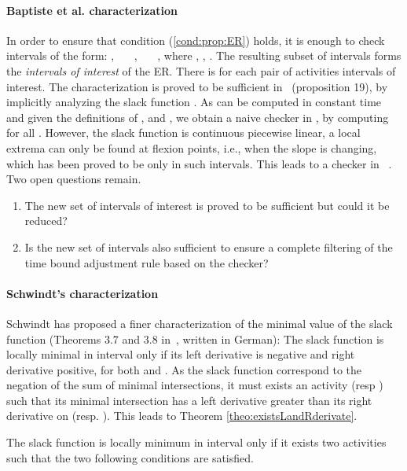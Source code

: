 \documentclass{llncs}
\begin{document}
\paragraph{\bf Baptiste et al. characterization}  
In order to ensure that condition (\ref{cond:prop:ER}) holds, it is enough to check intervals of the form: 
    ,~~~
    ,~~~
    ,
where
, 
,
.
The resulting subset of intervals forms the \emph{intervals of interest} of the ER. 
There is for each pair of activities   intervals of interest. 
The characterization is proved to be sufficient in~\cite{baptiste:inria-00123562} (proposition 19), by implicitly analyzing the slack function
 .
As  can be computed in constant time and given the definitions of ,  and , we obtain a naive checker in , by computing  for all . 
However, the slack function is continuous piecewise linear, a local extrema can only be found at flexion points,  i.e., when the slope is changing, which has been proved to be only in such intervals. 
This leads to a checker in ~\cite{baptiste:inria-00123562}.
Two open questions remain.
\begin{enumerate}
\item The new set of intervals of interest is proved to be sufficient but could it be reduced?
\item Is the new set of intervals also sufficient to ensure a complete filtering of the time bound adjustment rule based on the checker? 
\end{enumerate}


\paragraph{\bf Schwindt's characterization} Schwindt has proposed a finer characterization of the minimal value of the slack function (Theorems 3.7 and 3.8 in~\cite{schwindt98:PhD}, written in German):
The slack function is locally minimal in interval  only if its left derivative is negative and  right derivative positive, for both  and .
As the slack function correspond to the negation of the sum of minimal intersections,
it must exists an activity  (resp ) such that its minimal intersection has a left derivative greater than its right derivative on  (resp. ). This leads to Theorem \ref{theo:existsLandRderivate}.

\begin{theorem}\label{theo:existsLandRderivate}
The slack function is locally minimum in interval  only if it exists two activities  such that the two following conditions are satisfied. 

 
\end{theorem}
\end{document}
